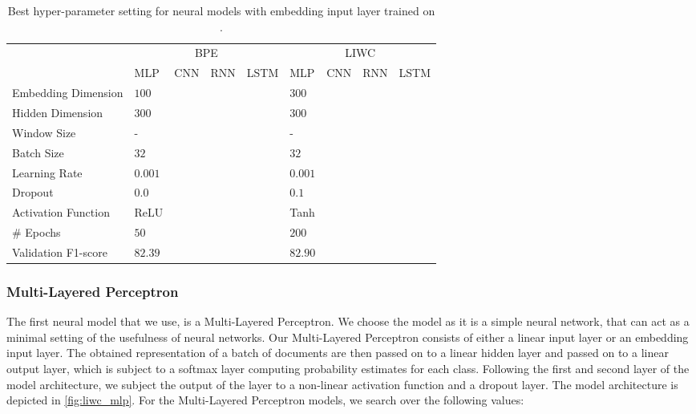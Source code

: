 \begin{landscape}
\begin{table}[]
\centering
\begin{tabular}{lllllllll}
                      & \multicolumn{4}{c}{BPE}               & \multicolumn{4}{c|}{LIWC} \\
                      & MLP     & CNN     & RNN     & LSTM    & MLP     & CNN     & RNN     & LSTM    \\ \hline
Embedding Dimension   & $100$   &         &         &         & $300$   &         &         &         \\
Hidden Dimension      & $300$   &         &         &         & $300$   &         &         &         \\
Window Size           & -       &         &         &         & -       &         &         &         \\        
Batch Size            & $32$    &         &         &         & $32$    &         &         &         \\        
Learning Rate         & $0.001$ &         &         &         & $0.001$ &         &         &         \\
Dropout               & $0.0$   &         &         &         & $0.1$   &         &         &         \\        
Activation Function   & ReLU    &         &         &         & Tanh    &         &         &         \\
# Epochs              & $50$    &         &         &         & $200$   &         &         &         \\
Validation F1-score   & $82.39$ &         &         &         & $82.90$ &         &         &
\end{tabular}
\caption{Best hyper-parameter setting for neural models with embedding input layer trained on \citet{Wulczyn:2017}.}
\label{tab:redux_hyperparam_search_wulczyn}
\end{table}
\end{landscape}


\subsubsection{Multi-Layered Perceptron}

The first neural model that we use, is a Multi-Layered Perceptron. We choose the model as it is a simple neural network, that can act as a minimal setting of the usefulness of neural networks. Our Multi-Layered Perceptron consists of either a linear input layer or an embedding input layer. The obtained representation of a batch of documents are then passed on to a linear hidden layer and passed on to a linear output layer, which is subject to a softmax layer computing probability estimates for each class. Following the first and second layer of the model architecture, we subject the output of the layer to a non-linear activation function and a dropout layer. The model architecture is depicted in \autoref{fig:liwc_mlp}. For the Multi-Layered Perceptron models, we search over the following values:

